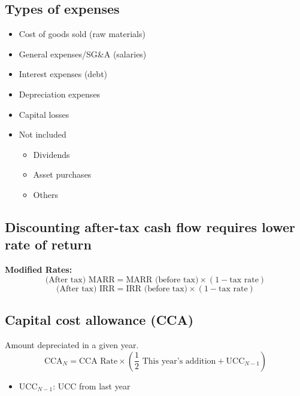 \subsection{Types of expenses}
\begin{terminology}
    \begin{itemize}
        \item Cost of goods sold (raw materials)
        \item General expenses/SG\&A (salaries)
        \item Interest expenses (debt)
        \item Depreciation expenses
        \item Capital losses
        \item Not included
        \begin{itemize}
            \item Dividends 
            \item Asset purchases 
            \item Others
        \end{itemize}
    \end{itemize}            
\end{terminology}

\subsection{Discounting after-tax cash flow requires lower rate of return}
\begin{definition} \textbf{Modified Rates:}
    \begin{equation}
        \text{(After tax) MARR} = \text{MARR (before tax)} \times (1 - \text{tax rate})
    \end{equation}
    \begin{equation}
        \text{(After tax) IRR} = \text{IRR (before tax)} \times (1 - \text{tax rate})
    \end{equation}
\end{definition}

\subsection{Capital cost allowance (CCA)}
\begin{definition} Amount depreciated in a given year.
    \begin{equation}
        \text{CCA}_N = \text{CCA Rate} \times \left( \frac{1}{2} \text{ This year's addition} + \text{UCC}_{N-1} \right)
    \end{equation}
    \begin{itemize}
        \item $ \text{UCC}_{N-1} $: UCC from last year
    \end{itemize}
\end{definition}

